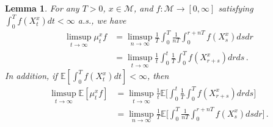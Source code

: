 \documentclass[final]{amsart}
\newtheorem{lem}[thm]{Lemma}
\numberwithin{thm}{section}
\numberwithin{equation}{section}
\newcommand{\E}{\mathbb{E}}
\newcommand{\mcM}{\mathcal{M}}
\begin{document}
\begin{lem}\label{time-equivalence}
    For any $T > 0$, $x \in \mcM$, and $f: \mcM \to [0,\infty]$ satisfying $\int_0^Tf(X_t^x)dt < \infty$ a.s., we have 
\begin{align*}
    \limsup_{t \to \infty} \mu_t^x f &
    = \limsup_{n \to \infty} \frac{1}{T}\int_0^T \frac{1}{nT} \int_0^{r + nT} f(X_s^x)dsdr \\
    &= 
    \limsup_{t \to \infty} \frac{1}{t}\int_0^t \frac{1}{T} \int_0^T f(X_{r+s}^x)drds 
     \,.
\end{align*}
  In addition, if   $\E[\int_0^Tf(X_t^x)dt] < \infty$, then
\begin{align*}  
    \limsup_{t \to \infty} \E[\mu_t^x f] &= 
    \limsup_{t \to \infty} \frac{1}{t}
    \E\Big[\int_0^t \frac{1}{T} \int_0^T f(X_{r+s}^x)drds\Big] \\
    &= \limsup_{n \to \infty} \frac{1}{T}\E\Big[ \int_0^T \frac{1}{nT} \int_0^{r + nT} f(X_s^x)dsdr\Big] \,.
\end{align*}
    
    
    
    
    
    
\end{lem}
\end{document}
